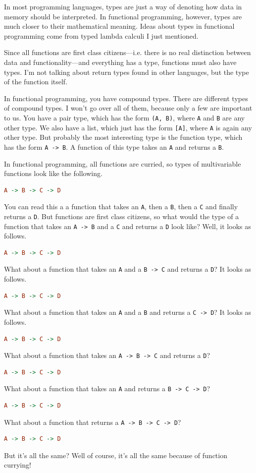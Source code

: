 \documentclass[11pt]{article}
\begin{document}
In most programming languages, types are just a way of denoting how data in
memory should be interpreted. In functional programming, however, types are
much closer to their mathematical meaning. Ideas about types in functional
programming come from typed lambda calculi I just mentioned.

Since all functions are first class citizens---i.e. there is no real
distinction between data and functionality---and everything has a type,
functions must also have types. I'm not talking about return types found in
other languages, but the type of the function itself.

In functional programming, you have compound types. There are different types
of compound types. I won't go over all of them, because only a few are
important to us. You have a pair type, which has the form \texttt{(A, B)},
where \texttt{A} and \texttt{B} are any other type. We also have a list, which
just has the form \texttt{[A]}, where \texttt{A} is again any other type. But
probably the most interesting type is the function type, which has the form
\texttt{A -> B}. A function of this type takes an \texttt{A} and returns a
\texttt{B}.

In functional programming, all functions are curried, so types of multivariable
functions look like the following.
\begin{lstlisting}[language=Haskell]
A -> B -> C -> D
\end{lstlisting}
You can read this a a function that takes an \texttt{A}, then a \texttt{B},
then a \texttt{C} and finally returns a \texttt{D}. But functions are first
class citizens, so what would the type of a function that takes an \texttt{A ->
B} and a \texttt{C} and returns a \texttt{D} look like? Well, it looks as
follows.
\begin{lstlisting}[language=Haskell]
A -> B -> C -> D
\end{lstlisting}
What about a function that takes an \texttt{A} and a \texttt{B -> C} and
returns a \texttt{D}? It looks as follows.
\begin{lstlisting}[language=Haskell]
A -> B -> C -> D
\end{lstlisting}
What about a function that takes an \texttt{A} and a \texttt{B} and returns a
\texttt{C -> D}? It looks as follows.
\begin{lstlisting}[language=Haskell]
A -> B -> C -> D
\end{lstlisting}
What about a function that takes an \texttt{A -> B -> C} and returns a
\texttt{D}?
\begin{lstlisting}[language=Haskell]
A -> B -> C -> D
\end{lstlisting}
What about a function that takes an \texttt{A} and returns a \texttt{B -> C ->
D}?
\begin{lstlisting}[language=Haskell]
A -> B -> C -> D
\end{lstlisting}
What about a function that returns a \texttt{A -> B -> C -> D}?
\begin{lstlisting}[language=Haskell]
A -> B -> C -> D
\end{lstlisting}
But it's all the same? Well of course, it's all the same because of function
currying!
\end{document}
